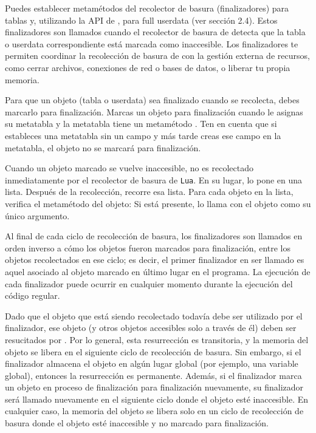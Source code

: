 Puedes establecer metamétodos del recolector de basura (finalizadores) para tablas y, utilizando la API de , para full userdata (ver sección 2.4). Estos finalizadores son llamados cuando el recolector de basura de  detecta que la tabla o userdata correspondiente está marcada como inaccesible. Los finalizadores te permiten coordinar la recolección de basura de  con la gestión externa de recursos, como cerrar archivos, conexiones de red o bases de datos, o liberar tu propia memoria.

Para que un objeto (tabla o userdata) sea finalizado cuando se recolecta, debes marcarlo para finalización. Marcas un objeto para finalización cuando le asignas su metatabla y la metatabla tiene un metamétodo . Ten en cuenta que si estableces una metatabla sin un campo  y más tarde creas ese campo en la metatabla, el objeto no se marcará para finalización.

Cuando un objeto marcado se vuelve inaccesible, no es recolectado inmediatamente por el recolector de basura de \texttt{Lua}. En su lugar,  lo pone en una lista. Después de la recolección,  recorre esa lista. Para cada objeto en la lista, verifica el metamétodo  del objeto: Si está presente,  lo llama con el objeto como su único argumento.

Al final de cada ciclo de recolección de basura, los finalizadores son llamados en orden inverso a cómo los objetos fueron marcados para finalización, entre los objetos recolectados en ese ciclo; es decir, el primer finalizador en ser llamado es aquel asociado al objeto marcado en último lugar en el programa. La ejecución de cada finalizador puede ocurrir en cualquier momento durante la ejecución del código regular.

Dado que el objeto que está siendo recolectado todavía debe ser utilizado por el finalizador, ese objeto (y otros objetos accesibles solo a través de él) deben ser resucitados por . Por lo general, esta resurrección es transitoria, y la memoria del objeto se libera en el siguiente ciclo de recolección de basura. Sin embargo, si el finalizador almacena el objeto en algún lugar global (por ejemplo, una variable global), entonces la resurrección es permanente. Además, si el finalizador marca un objeto en proceso de finalización para finalización nuevamente, su finalizador será llamado nuevamente en el siguiente ciclo donde el objeto esté inaccesible. En cualquier caso, la memoria del objeto se libera solo en un ciclo de recolección de basura donde el objeto esté inaccesible y no marcado para finalización.

